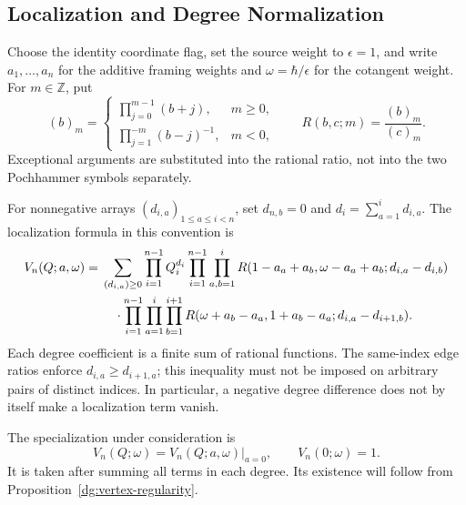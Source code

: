 \documentclass[11pt]{amsart}
\theoremstyle{definition}
\theoremstyle{remark}
\numberwithin{equation}{section}
\newcommand{\Z}{\mathbb Z}
\newcommand{\eps}{\epsilon}
\begin{document}
\subsection{Localization and Degree Normalization}
\label{sec:geometry}
Choose the identity coordinate flag, set the source weight to
$\eps=1$, and write $a_1,\ldots,a_n$ for the additive framing
weights and $\omega=\hbar/\eps$ for the cotangent weight. For
$m\in\Z$, put
\[
 (b)_m=\begin{cases}
 \prod_{j=0}^{m-1}(b+j),&m\geq0,\\
 \displaystyle\prod_{j=1}^{-m}(b-j)^{-1},&m<0,
 \end{cases}
 \qquad R(b,c;m)=\frac{(b)_m}{(c)_m}.
\]
Exceptional arguments are substituted into the rational ratio,
not into the two Pochhammer symbols separately.

For nonnegative arrays $(d_{i,a})_{1\leq a\leq i<n}$, set
$d_{n,b}=0$ and $d_i=\sum_{a=1}^i d_{i,a}$. The localization
formula in this convention is
\begin{align}
 V_n(Q;a,\omega)
 ={}&\sum_{(d_{i,a})\geq0}\prod_{i=1}^{n-1}Q_i^{d_i}
 \prod_{i=1}^{n-1}\prod_{a,b=1}^{i}
 R(1-a_a+a_b,\omega-a_a+a_b;d_{i,a}-d_{i,b})\notag\\
 &\quad\cdot\prod_{i=1}^{n-1}\prod_{a=1}^{i}\prod_{b=1}^{i+1}
 R(\omega+a_b-a_a,1+a_b-a_a;d_{i,a}-d_{i+1,b}).
 \label{ge:localization}
\end{align}
Each degree coefficient is a finite sum of rational functions.
The same-index edge ratios enforce
$d_{i,a}\geq d_{i+1,a}$; this inequality must not be imposed on
arbitrary pairs of distinct indices. In particular, a negative
degree difference does not by itself make a localization term
vanish.

The specialization under consideration is
\begin{equation}\label{ge:vertex-limit}
 V_n(Q;\omega)=\left.V_n(Q;a,\omega)\right|_{a=0},
 \qquad V_n(0;\omega)=1.
\end{equation}
It is taken after summing all terms in each degree. Its existence
will follow from Proposition~\ref{dg:vertex-regularity}.
\end{document}
